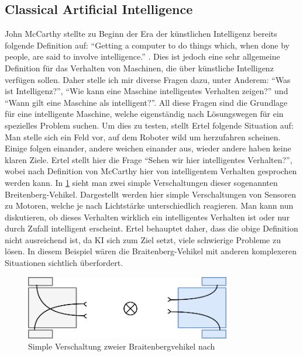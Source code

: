     \subsection{Classical Artificial Intelligence}\label{subsec:cai}
    John McCarthy stellte zu Beginn der Era der künstlichen Intelligenz bereits folgende Definition
    auf: ``Getting a computer to do things which, when done by people, are said to involve intelligence.'' 
    \cite[p. 1]{ertel2016grundkurs}. Dies ist jedoch eine sehr allgemeine Definition für das 
    Verhalten von Maschinen, die über künstliche Intelligenz verfügen sollen. Daher stelle ich mir 
    diverse Fragen dazu, unter Anderem: ``Was ist Intelligenz?'', ``Wie kann eine Maschine intelligentes
    Verhalten zeigen?'' und ``Wann gilt eine Maschine als intelligent?''. All diese Fragen sind die 
    Grundlage für eine intelligente Maschine, welche eigenständig nach Lösungswegen für ein spezielles
    Problem suchen. Um dies zu testen, stellt Ertel folgende Situation auf: Man stelle sich ein Feld 
    vor, auf dem Roboter wild um herzufahren scheinen. Einige folgen einander, andere weichen einander 
    aus, wieder andere haben keine klaren Ziele. \cite[p. 2]{ertel2016grundkurs} Ertel stellt hier die
    Frage ``Sehen wir hier intelligentes Verhalten?'', wobei nach Definition von McCarthy hier von 
    intelligentem Verhalten gesprochen werden kann. In \ref{pic:braitenberg-vehikel} sieht man zwei 
    simple Verschaltungen dieser sogenannten Breitenberg-Vehikel. Dargestellt werden hier simple 
    Verschaltungen von Sensoren zu Motoren, welche je nach Lichtstärke unterschiedlich reagieren. 
    Man kann nun diskutieren, ob dieses Verhalten wirklich ein intelligentes Verhalten ist oder
    nur durch Zufall intelligent erscheint. Ertel behauptet daher, dass die obige Definition nicht
    ausreichend ist, da KI sich zum Ziel setzt, viele schwierige Probleme zu lösen. In diesem Beispiel
    wären die Braitenberg-Vehikel mit anderen komplexeren Situationen sichtlich überfordert.
    
    \begin{figure}[h]\begin{center}
        \includegraphics[width=0.8\textwidth]{figures/braitenberg-roboter.png}
        \caption[Verschaltung Braitenberg-Vehikel]{Simple Verschaltung zweier Braitenbergvehikel nach \cite{ertel2016grundkurs}}
        \label{pic:braitenberg-vehikel}
    \end{center}\end{figure}
    
